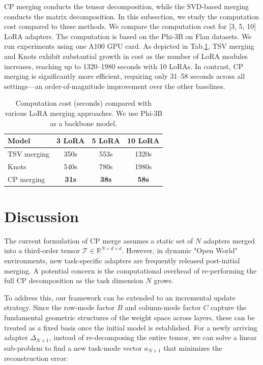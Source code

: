\documentclass[10pt]{article} %
\begin{document}
CP merging conducts the tensor decomposition, while the SVD-based merging conducts the matrix decomposition. In this subsection, we study the computation cost compared to these methods. We compare the computation cost for [3, 5, 10] LoRA adapters. The computation is based on the Phi-3B on Flan datasets. We run experiments using one A100 GPU card. As depicted in Tab.\ref{tab:computation_copmarison}, TSV merging and Knots exhibit substantial growth in cost as the number of LoRA modules increases, reaching up to 1320–1980 seconds with 10 LoRAs. In contrast, CP merging is significantly more efficient, requiring only 31–58 seconds across all settings—an order-of-magnitude improvement over the other baselines.
\begin{table}
    \centering
    \begin{tabular}{l|ccc}
    \toprule
      Model  & 3 LoRA & 5 LoRA & 10 LoRA \\
    \midrule
     TSV merging & 350s & 553s & 1320s\\
     Knots & 540s & 780s & 1980s\\
     \midrule
     CP merging & \textbf{31s} & \textbf{38s} & \textbf{58s}\\
     \bottomrule
    \end{tabular}
    \caption{Computation cost (seconds) compared with various LoRA merging approaches. We use Phi-3B as a backbone model. }
    \label{tab:computation_copmarison}
\end{table}

\section{Discussion}

The current formulation of CP merge assumes a static set of $N$ adapters merged into a third-order tensor $\mathcal{T} \in \mathbb{R}^{N \times d \times d}$. However, in dynamic "Open World" environments, new task-specific adapters are frequently released post-initial merging. A potential concern is the computational overhead of re-performing the full CP decomposition as the task dimension $N$ grows.

To address this, our framework can be extended to an incremental update strategy. Since the row-mode factor $B$ and column-mode factor $C$ capture the fundamental geometric structures of the weight space across layers, these can be treated as a fixed basis once the initial model is established. For a newly arriving adapter $\Delta_{N+1}$, instead of re-decomposing the entire tensor, we can solve a linear sub-problem to find a new task-mode vector $a_{N+1}$ that minimizes the reconstruction error:
\end{document}
